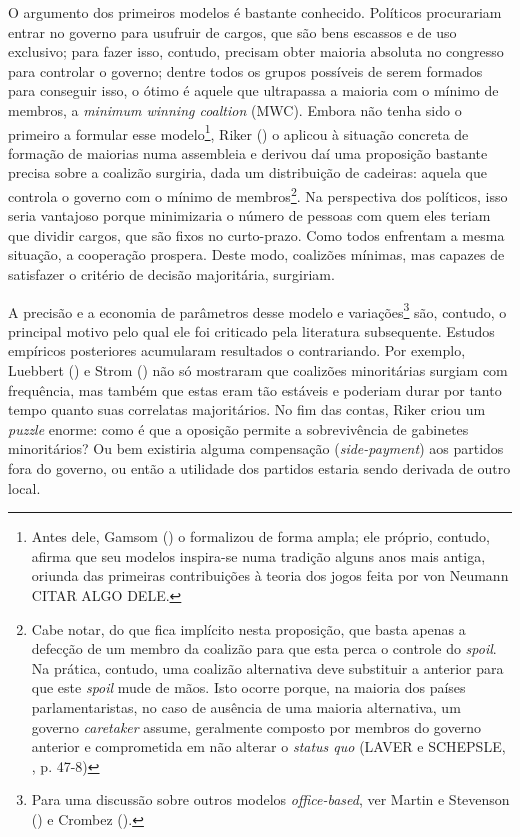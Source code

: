 O argumento dos primeiros modelos é bastante conhecido. Políticos procurariam entrar no governo para usufruir de cargos, que são bens escassos e de uso exclusivo; para fazer isso, contudo, precisam obter maioria absoluta no congresso para controlar o governo; dentre todos os grupos possíveis de serem formados para conseguir isso, o ótimo é aquele que ultrapassa a maioria com o mínimo de membros, a \textit{minimum winning coaltion} (MWC). Embora não tenha sido o primeiro a formular esse modelo\footnote{Antes dele, Gamsom (\citeyear{gamson1961}) o formalizou de forma ampla; ele próprio, contudo, afirma que seu modelos inspira-se numa tradição alguns anos mais antiga, oriunda das primeiras contribuições à teoria dos jogos feita por von Neumann CITAR ALGO DELE.}, Riker (\citeyear{riker1962}) o aplicou à situação concreta de formação de maiorias numa assembleia e derivou daí uma proposição bastante precisa sobre a coalizão surgiria, dada um distribuição de cadeiras: aquela que controla o governo com o mínimo de membros\footnote{Cabe notar, do que fica implícito nesta proposição, que basta apenas a defecção de um membro da coalizão para que esta perca o controle do \textit{spoil}. Na prática, contudo, uma coalizão alternativa deve substituir a anterior para que este \textit{spoil} mude de mãos. Isto ocorre porque, na maioria dos países parlamentaristas, no caso de ausência de uma maioria alternativa, um governo \textit{caretaker} assume, geralmente composto por membros do governo anterior e comprometida em não alterar o \textit{status quo} (LAVER e SCHEPSLE, \citeyear{laver1996}, p. 47-8)}. Na perspectiva dos políticos, isso seria vantajoso porque minimizaria o número de pessoas com quem eles teriam que dividir cargos, que são fixos no curto-prazo. Como todos enfrentam a mesma situação, a cooperação prospera. Deste modo, coalizões mínimas, mas capazes de satisfazer o critério de decisão majoritária, surgiriam.

A precisão e a economia de parâmetros desse modelo e variações\footnote{Para uma discussão sobre outros modelos \textit{office-based}, ver Martin e Stevenson (\citeyear{martin2001}) e Crombez (\citeyear{crombez1996}).} são, contudo, o principal motivo pelo qual ele foi criticado pela literatura subsequente. Estudos empíricos posteriores acumularam resultados o contrariando. Por exemplo, Luebbert (\citeyear{luebbert1986}) e Strom (\citeyear{strom1990}) não só mostraram que coalizões minoritárias surgiam com frequência, mas também que estas eram tão estáveis e poderiam durar por tanto tempo quanto suas correlatas majoritários. No fim das contas, Riker criou um \textit{puzzle} enorme: como é que a oposição permite a sobrevivência de gabinetes minoritários? Ou bem existiria alguma compensação (\textit{side-payment}) aos partidos fora do governo, ou então a utilidade dos partidos estaria sendo derivada de outro local.

